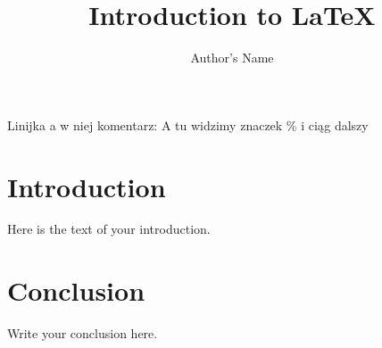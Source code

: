 \documentclass{article}
\begin{document}
\title{Introduction to \LaTeX{}}
\author{Author's Name}
\maketitle

Linijka a w niej komentarz: %
A tu widzimy znaczek \% i ciąg dalszy

\section{Introduction}
Here is the text of your introduction.

\section{Conclusion}
Write your conclusion here.
\end{document}
